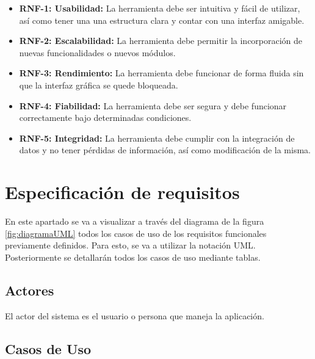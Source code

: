 \begin{itemize}
\item
\textbf{RNF-1: Usabilidad:} La herramienta debe ser intuitiva y fácil de utilizar, así como tener una una estructura clara y contar con una interfaz amigable.
\item
\textbf{RNF-2: Escalabilidad:} La herramienta debe permitir la incorporación de nuevas funcionalidades o nuevos módulos. 
\item
\textbf{RNF-3: Rendimiento:} La herramienta debe funcionar de forma fluida sin que la interfaz gráfica se quede bloqueada.
\item
\textbf{RNF-4: Fiabilidad:} La herramienta debe ser segura y debe funcionar correctamente bajo determinadas condiciones.  
\item
\textbf{RNF-5: Integridad:} La herramienta debe cumplir con la integración de datos y no tener pérdidas de información, así como modificación de la misma. 

\end{itemize}
\newpage


\section{Especificación de requisitos}
En este apartado se va a visualizar a través del diagrama de la figura \ref{fig:diagramaUML} todos los casos de uso de los requisitos funcionales previamente definidos. Para esto, se va a utilizar la notación UML. Posteriormente se detallarán todos los casos de uso mediante tablas.

\subsection{Actores}
El actor del sistema es el usuario o persona que maneja la aplicación.


\subsection{Casos de Uso}

